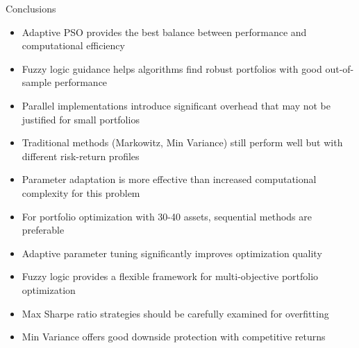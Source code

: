 \documentclass[aspectratio=169,xcolor=table]{beamer}
\begin{document}
\begin{frame}{Conclusions}
  \begin{tcolorbox}[
    enhanced,
    colback=blue!5,
    colframe=blue!70,
    arc=2mm,
    title=Key Findings,
    fonttitle=\bfseries\large,
    boxrule=0.5mm
  ]
    \begin{itemize}
      \item Adaptive PSO provides the best balance between performance and computational efficiency
      \item Fuzzy logic guidance helps algorithms find robust portfolios with good out-of-sample performance
      \item Parallel implementations introduce significant overhead that may not be justified for small portfolios
      \item Traditional methods (Markowitz, Min Variance) still perform well but with different risk-return profiles
      \item Parameter adaptation is more effective than increased computational complexity for this problem
    \end{itemize}
  \end{tcolorbox}
  
  \vspace{0.3cm}
  
  \begin{tcolorbox}[
    enhanced,
    colback=green!5,
    colframe=green!70,
    arc=2mm,
    title=Practical Implications,
    fonttitle=\bfseries\large,
    boxrule=0.5mm
  ]
    \begin{itemize}
      \item For portfolio optimization with 30-40 assets, sequential methods are preferable
      \item Adaptive parameter tuning significantly improves optimization quality
      \item Fuzzy logic provides a flexible framework for multi-objective portfolio optimization
      \item Max Sharpe ratio strategies should be carefully examined for overfitting
      \item Min Variance offers good downside protection with competitive returns
    \end{itemize}
  \end{tcolorbox}
\end{frame}
\end{document}

